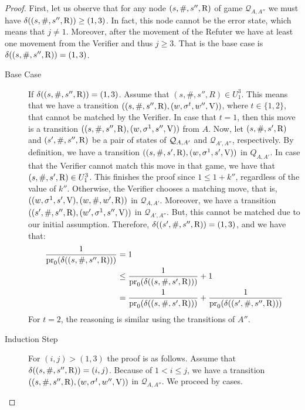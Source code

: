 \begin{proof}
First, let us observe that for any node $(s, \#, s'', \mathrm{R})$ of game $\mathcal{Q}_{A,A''}$ we must have $\delta((s, \#, s'', \mathrm{R})) \geq (1,3)$.
In fact, this node cannot be the error state, which means that $j \neq 1$. Moreover, after the movement of the Refuter we have at least one movement from the Verifier and thus $j \geq 3$. That is the base case is $\delta((s,\#, s'', \mathrm{R})) = (1,3)$.
\begin{description}
\item [Base Case] If $\delta((s,\#, s'', \mathrm{R})) = (1,3)$. Assume that $(s, \#, s'', R) \in U^3_1$. This means that we have a transition 
$((s, \#, s'', \mathrm{R}), (w, \sigma^t, w'', \mathrm{V}))$, where $t \in \{1,2\}$, that cannot be matched by the Verifier. 
In case that $t=1$, then this move is a transition $((s, \#, s'', \mathrm{R}), (w, \sigma^1, s'', \mathrm{V}))$ from $A$. 
Now, let $(s, \#, s', \mathrm{R})$ and $(s', \#, s'', \mathrm{R})$ be a pair of states of $\mathcal{Q}_{A, A'}$ and $\mathcal{Q}_{A',A''}$, respectively. 
By definition, we have a transition $((s, \#, s', \mathrm{R}), (w, \sigma^1, s', \mathrm{V}))$ in $Q_{A,A'}$. 
In case that the Verifier cannot match this move in that game, we have that $(s, \#, s', \mathrm{R}) \in U^3_1$. 
This finishes the proof since $1 \leq 1 + k''$, regardless of the value of $k''$. 
Otherwise, the Verifier chooses a matching move, that is, $((w, \sigma^1, s', \mathrm{V}), (w, \#, w', \mathrm{R}))$ in $\mathcal{Q}_{A,A'}$. 
Moreover, we have a transition $((s', \#, s'', \mathrm{R}), (w', \sigma^1, s'', \mathrm{V}))$ in $\mathcal{Q}_{A',A''}$. 
But, this cannot be matched due to our initial assumption. Therefore, $\delta((s', \#, s'', \mathrm{R}))= (1,3)$, and we have that:
\begin{align*}
	\frac{1}{\operatorname{pr}_{0}(\delta((s,\#, s'', \mathrm{R})))}  & = 1\\
							& \leq \frac{1}{\operatorname{pr}_{0}(\delta((s, \#, s', \mathrm{R})))} + 1\\
							& =   \frac{1}{\operatorname{pr}_{0}(\delta((s, \#, s', \mathrm{R})))}  + \frac{1}{\operatorname{pr}_{0}(\delta((s', \#, s'', \mathrm{R})))}
\end{align*}
For $t=2$,  the reasoning is similar using the transitions of $A''$. 

\item [Induction Step] For $(i,j) > (1,3)$ the proof is as follows. 
Assume that $\delta((s, \#, s'', \mathrm{R})) = (i,j)$. Because of $1<i \leq j$, we have a transition 
$((s, \#, s'', \mathrm{R}), (w, \sigma^t, w'', \mathrm{V}))$ in $\mathcal{Q}_{A,A''}$. We proceed by cases.


\end{description}
\end{proof}

